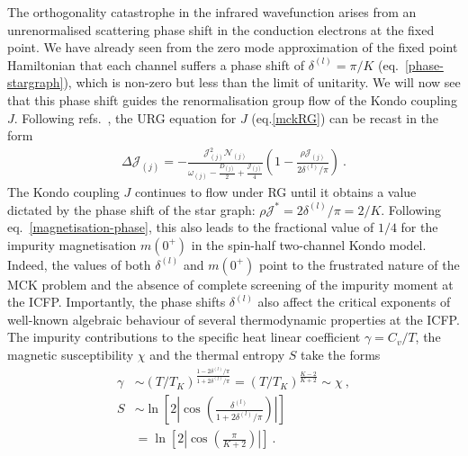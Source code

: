 \documentclass{iopart}
\begin{document}
The orthogonality catastrophe in the infrared wavefunction arises from an unrenormalised scattering phase shift in the conduction electrons at the fixed point. We have already seen from the zero mode approximation of the fixed point Hamiltonian that each channel suffers a phase shift of \(\delta^{(l)} = \pi/K\) (eq.~\ref{phase-stargraph}), which is non-zero but less than the limit of unitarity. We will now see that this phase shift guides the renormalisation group flow of the Kondo coupling \(J\). Following refs.~\cite{si_kotliar_1993,giamarchi_varma_1993,giamarchi_book}, the URG equation for \(J\) (eq.\ref{mckRG}) can be recast in the form
\begin{equation}\begin{aligned}
	\Delta {\mathcal{J}}_{(j)} = -\frac{{\mathcal{J}}_{(j)}^2 \mathcal{N}_{(j)}}{\omega_{(j)} - \frac{D_{(j)}}{2} + \frac{{\mathcal{J}}_{(j)}}{4}}\left( 1 - \frac{\rho {\mathcal{J}}_{(j)}}{2\delta^{(l)}/\pi} \right)~.
\end{aligned}\label{scattphaseRG}\end{equation}
The Kondo coupling $J$ continues to flow under RG until it obtains a value dictated by the phase shift of the star graph: \(\rho \mathcal{J}^* = 2\delta^{(l)}/\pi = 2/K\). Following eq.~\ref{magnetisation-phase}, this also leads to the fractional value of \(1/4\) for the impurity magnetisation \(m(0^+)\) in the spin-half two-channel Kondo model. Indeed, the values of both \(\delta^{(l)}\) and \(m(0^+)\) point to the frustrated nature of the MCK problem and the absence of complete screening of the impurity moment at the ICFP. Importantly, the phase shifts \(\delta^{(l)}\) also affect the critical exponents of well-known algebraic behaviour of several thermodynamic properties at the ICFP. The impurity contributions to the specific heat linear coefficient \(\gamma = C_v/T\), the magnetic susceptibility \(\chi\) and the thermal entropy \(S\) take the forms~\cite{andrei_destri_1984,Tsvelick_Weigmann_mchannel_1984,affleck1993exact}
\begin{eqnarray}
	\gamma &\sim  \left( T/T_K \right)^\frac{1 - 2\delta^{(l)}/\pi}{1 + 2\delta^{(l)}/\pi} = \left( T/T_K \right)^\frac{K-2}{K+2}\sim \chi~,\nonumber\\ 
	S &\sim  \ln \left[2|\cos \left(\frac{\delta^{(l)}}{1 + 2\delta^{(l)}/\pi}\right)|\right] \nonumber \\
	  &= \ln \left[2|\cos \left(\frac{\pi}{K + 2}\right)|\right]~. \label{powerlawquants}
\end{eqnarray}
\end{document}
